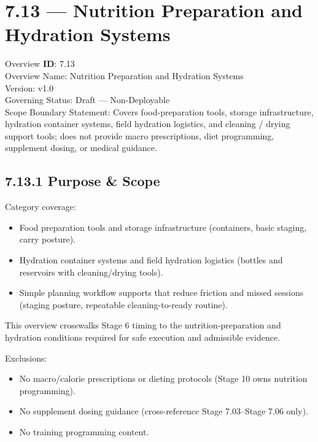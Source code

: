 \documentclass[10pt]{article}
\begin{document}
\section*{7.13 — Nutrition Preparation and Hydration Systems}
{}

Overview \textbf{ID}: 7.13\\
Overview Name: Nutrition Preparation and Hydration Systems\\
Version: v1.0\\
Governing Status: Draft — Non-Deployable\\
Scope Boundary Statement: Covers food-preparation tools, storage infrastructure, hydration container systems, field hydration logistics, and cleaning / drying support tools; does not provide macro prescriptions, diet programming, supplement dosing, or medical guidance.

\subsection*{7.13.1 Purpose \& Scope}
{}

Category coverage:

\begin{itemize}
\item Food preparation tools and storage infrastructure (containers, basic staging, carry posture).
\item Hydration container systems and field hydration logistics (bottles and reservoirs with cleaning/drying tools).
\item Simple planning workflow supports that reduce friction and missed sessions (staging posture, repeatable cleaning-to-ready routine).
\end{itemize}

This overview crosswalks Stage 6 timing to the nutrition-preparation and hydration conditions required for safe execution and admissible evidence.

Exclusions:

\begin{itemize}
\item No macro/calorie prescriptions or dieting protocols (Stage 10 owns nutrition programming).
\item No supplement dosing guidance (cross-reference Stage 7.03–Stage 7.06 only).
\item No training programming content.
\end{itemize}
\end{document}
